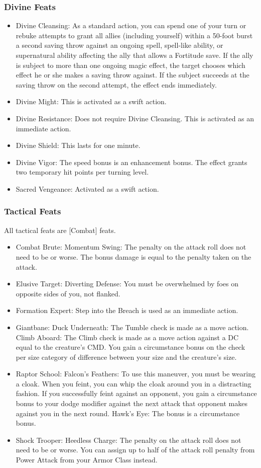 \subsubsection{Divine Feats}
\begin{itemize}
\item Divine Cleansing: As a standard action, you can spend one of your turn or rebuke attempts to grant all allies (including yourself) within a 50-foot burst a second saving throw against an ongoing spell, spell-like ability, or supernatural ability affecting the ally that allows a Fortitude save. If the ally is subject to more than one ongoing magic effect, the target chooses which effect he or she makes a saving throw against. If the subject succeeds at the saving throw on the second attempt, the effect ends immediately.
\item Divine Might: This is activated as a swift action.
\item Divine Resistance: Does not require Divine Cleansing. This is activated as an immediate action.
\item Divine Shield: This lasts for one minute.
\item Divine Vigor: The speed bonus is an enhancement bonus. The effect grants two temporary hit points per turning level.
\item Sacred Vengeance: Activated as a swift action.
\end{itemize}
\subsubsection{Tactical Feats}
All tactical feats are [Combat] feats.
\begin{itemize}
\item Combat Brute: Momentum Swing: The penalty on the attack roll does not need to be  or worse. The bonus damage is equal to the penalty taken on the attack.
\item Elusive Target: Diverting Defense: You must be overwhelmed by foes on opposite sides of you, not flanked.
\item Formation Expert: Step into the Breach is used as an immediate action.
\item Giantbane: Duck Underneath: The Tumble check is made as a move action. Climb Aboard: The Climb check is made as a move action against a DC equal to the creature's CMD. You gain a  circumstance bonus on the check per size category of difference between your size and the creature's size.
\item Raptor School: Falcon's Feathers: To use this maneuver, you must be wearing a cloak. When you feint, you can whip the cloak around you in a distracting fashion. If you successfully feint against an opponent, you gain a  circumstance bonus to your dodge modifier against the next attack that opponent makes against you in the next round. Hawk's Eye: The bonus is a circumstance bonus.
\item Shock Trooper: Heedless Charge: The penalty on the attack roll does not need to be  or worse. You can assign up to half of the attack roll penalty from Power Attack from your Armor Class instead.
\end{itemize}
